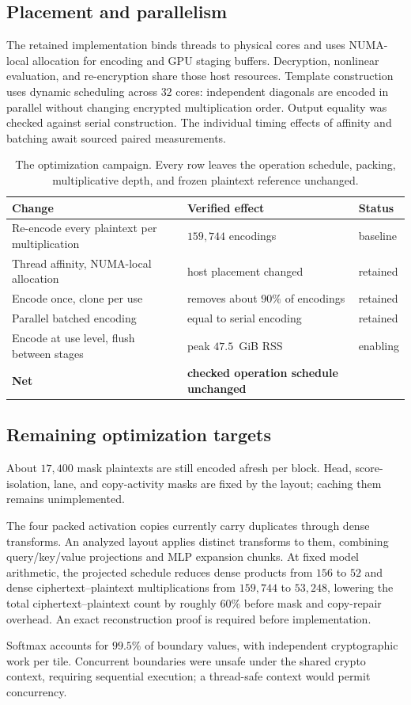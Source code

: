 \subsection{Placement and parallelism}
The retained implementation binds threads to physical cores and uses NUMA-local allocation for
encoding and GPU staging buffers. Decryption, nonlinear evaluation, and re-encryption share those
host resources. Template construction uses dynamic scheduling across $32$ cores: independent
diagonals are encoded in parallel without changing encrypted multiplication order. Output equality
was checked against serial construction. The individual timing effects of affinity and batching
await sourced paired measurements.

\begin{table}[t]\centering\small
\caption{The optimization campaign. Every row leaves the operation schedule, packing,
multiplicative depth, and frozen plaintext reference unchanged.}
\label{tab:optimization}
\begin{tabularx}{\textwidth}{Y l l}
\toprule
Change & Verified effect & Status \\
\midrule
Re-encode every plaintext per multiplication & $159{,}744$ encodings & baseline \\
Thread affinity, NUMA-local allocation & host placement changed & retained \\
Encode once, clone per use & removes about $90\%$ of encodings & retained \\
Parallel batched encoding & equal to serial encoding & retained \\
Encode at use level, flush between stages & peak $47.5$~GiB RSS & enabling \\
\midrule
\textbf{Net} & \textbf{checked operation schedule unchanged} & \\
\bottomrule
\end{tabularx}
\end{table}

\subsection{Remaining optimization targets}
About $17{,}400$ mask plaintexts are still encoded afresh per block. Head, score-isolation, lane,
and copy-activity masks are fixed by the layout; caching them remains unimplemented.

The four packed activation copies currently carry duplicates through dense transforms. An analyzed
layout applies distinct transforms to them, combining query/key/value projections and MLP expansion
chunks. At fixed model arithmetic, the projected schedule reduces dense products from $156$ to
$52$ and dense ciphertext--plaintext multiplications from $159{,}744$ to $53{,}248$, lowering the
total ciphertext--plaintext count by roughly $60\%$ before mask and copy-repair overhead. An exact
reconstruction proof is required before implementation.

Softmax accounts for $99.5\%$ of boundary values, with independent cryptographic work per tile.
Concurrent boundaries were unsafe under the shared crypto context, requiring sequential execution;
a thread-safe context would permit concurrency.
